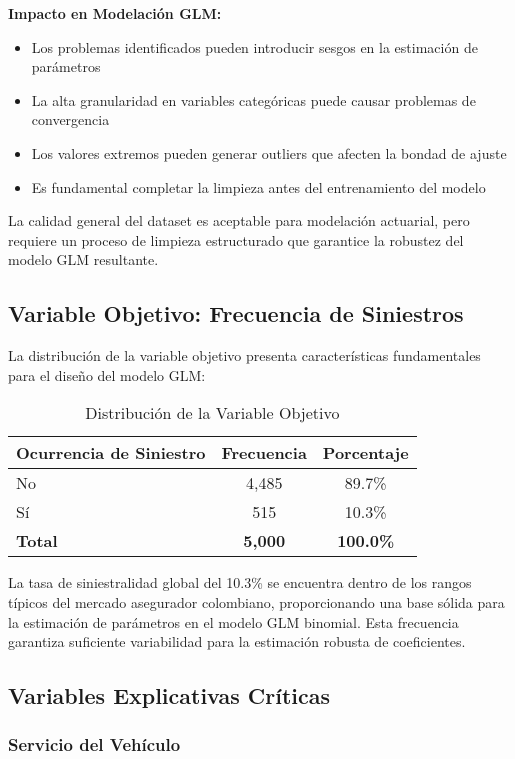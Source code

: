\textbf{Impacto en Modelación GLM:}
\begin{itemize}
\item Los problemas identificados pueden introducir sesgos en la estimación de parámetros
\item La alta granularidad en variables categóricas puede causar problemas de convergencia
\item Los valores extremos pueden generar outliers que afecten la bondad de ajuste
\item Es fundamental completar la limpieza antes del entrenamiento del modelo
\end{itemize}

La calidad general del dataset es aceptable para modelación actuarial, pero requiere un proceso de limpieza estructurado que garantice la robustez del modelo GLM resultante.

\subsection{Variable Objetivo: Frecuencia de Siniestros}

La distribución de la variable objetivo presenta características fundamentales para el diseño del modelo GLM:

\begin{table}[H]
\centering
\caption{Distribución de la Variable Objetivo}
\begin{tabular}{|l|c|c|}
\hline
\textbf{Ocurrencia de Siniestro} & \textbf{Frecuencia} & \textbf{Porcentaje} \\
\hline
No & 4,485 & 89.7\% \\
Sí & 515 & 10.3\% \\
\hline
\textbf{Total} & \textbf{5,000} & \textbf{100.0\%} \\
\hline
\end{tabular}
\end{table}

La tasa de siniestralidad global del 10.3\% se encuentra dentro de los rangos típicos del mercado asegurador colombiano, proporcionando una base sólida para la estimación de parámetros en el modelo GLM binomial. Esta frecuencia garantiza suficiente variabilidad para la estimación robusta de coeficientes.

\subsection{Variables Explicativas Críticas}

\subsubsection{Servicio del Vehículo}

